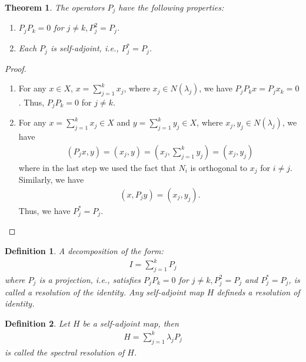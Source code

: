 \documentclass[11pt]{book}
\newtheorem{definition}{Definition}[section]
\newtheorem{theorem}{Theorem}[section]
\theoremstyle{definition}
\numberwithin{equation}{chapter}
\begin{document}
\begin{theorem}
The operators $P_j$ have the following properties:
\begin{enumerate}[label=(\alph*)]
    \item $P_j P_k = 0$ for $j\neq k, P_j^2 = P_j$.
    \item Each $P_j$ is self-adjoint, i.e., $P_j^* = P_j$.
\end{enumerate}
\end{theorem}
\begin{proof}
~\begin{enumerate}[label=(\alph*)]
    \item For any $x\in X$, $x = \sum^k_{j=1}x_j$, where $x_j\in N(\lambda_j)$, we have $P_j P_k x = P_j x_k = 0$. Thus, $P_j P_k = 0$ for $j\neq k$.
    \item For any $x = \sum^k_{j=1}x_j \in X$ and $y = \sum^k_{j=1}y_j \in X$, where $x_j, y_j \in N(\lambda_j)$, we have
    \begin{align*}
        \left(P_j x, y\right) = \left(x_j, y\right) = \left(x_j, \sum^k_{j=1}y_j\right) = \left(x_j, y_j\right)
    \end{align*}
    where in the last step we used the fact that $N_i$ is orthogonal to $x_j$ for $i\neq j$. Similarly, we have
    \begin{align*}
        \left(x, P_j y\right) = \left(x_j, y_j\right).
    \end{align*}
    Thus, we have $P_j^* = P_j$.
\end{enumerate}
\end{proof}

\medskip

\begin{definition}
A decomposition of the form:
\begin{align*}
    I = \sum^k_{j=1} P_j
\end{align*}
where $P_j$ is a projection, i.e., satisfies $P_j P_k = 0$ for $j\neq k, P_j^2 = P_j$ and $P_j^* = P_j$, is called a resolution of the identity. Any self-adjoint map $H$ defineds a resolution of identity.
\end{definition}

\medskip

\begin{definition}
Let $H$ be a self-adjoint map, then 
\begin{align*}
    H = \sum^k_{j=1} \lambda_j P_j
\end{align*}
is called the spectral resolution of $H$.
\end{definition}
\end{document}
